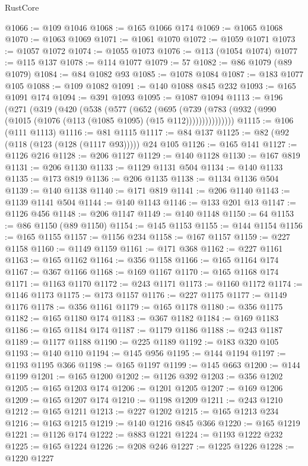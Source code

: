 \begin{lexlean}{RustCore}
\begin{coremodule}
@1066 := @109 @1046
@1068 := @165 @1066 @174
@1069 := @1065 @1068
@1070 := @1063 @1069
@1071 := @1061 @1070
@1072 := @1059 @1071
@1073 := @1057 @1072
@1074 := @1055 @1073
@1076 := @113 (@1054 @1074)
@1077 := @115 @137
@1078 := @114 @1077
@1079 := 57
@1082 := @86 @1079 (@89 @1079)
@1084 := @84 @1082 @93
@1085 := @1078 @1084
@1087 := @183 @1077 @105
@1088 := @109 @1082
@1091 := @140 @1088 @845 @232
@1093 := @165 @1091 @174
@1094 := @391 @1093
@1095 := @1087 @1094
@1113 := @196
    (@271
      (@319
        (@420
          (@538
            (@577
              (@652
                (@695
                  (@739 (@783 (@932 (@990 (@1015 (@1076 (@113 (@1085 @1095) (@15 @112)))))))))))))))
@1115 := @106 (@111 @1113)
@1116 := @81 @1115
@1117 := @84 @137
@1125 := @82 (@92 (@118 (@123 (@128 (@1117 @93))))) @24 @105
@1126 := @165 @141
@1127 := @1126 @216
@1128 := @206 @1127
@1129 := @140 @1128
@1130 := @167 @819
@1131 := @206 @1130
@1133 := @1129 @1131 @504
@1134 := @140 @1133
@1135 := @173 @819
@1136 := @206 @1135
@1138 := @1134 @1136 @504
@1139 := @140 @1138
@1140 := @171 @819
@1141 := @206 @1140
@1143 := @1139 @1141 @504
@1144 := @140 @1143
@1146 := @133 @201 @13
@1147 := @1126 @456
@1148 := @206 @1147
@1149 := @140 @1148
@1150 := 64
@1153 := @86 @1150 (@89 @1150)
@1154 := @145 @1153
@1155 := @144 @1154
@1156 := @165 @1155
@1157 := @1156 @234
@1158 := @167 @1157
@1159 := @227 @1158
@1160 := @1149 @1159
@1161 := @171 @368
@1162 := @227 @1161
@1163 := @165 @1162
@1164 := @356 @1158
@1166 := @165 @1164 @174
@1167 := @367 @1166
@1168 := @169 @1167
@1170 := @165 @1168 @174
@1171 := @1163 @1170
@1172 := @243 @1171
@1173 := @1160 @1172
@1174 := @1146 @1173
@1175 := @173 @1157
@1176 := @227 @1175
@1177 := @1149 @1176
@1178 := @356 @1161
@1179 := @165 @1178
@1180 := @356 @1175
@1182 := @165 @1180 @174
@1183 := @367 @1182
@1184 := @169 @1183
@1186 := @165 @1184 @174
@1187 := @1179 @1186
@1188 := @243 @1187
@1189 := @1177 @1188
@1190 := @225 @1189
@1192 := @183 @320 @105
@1193 := @140 @110
@1194 := @145 @956
@1195 := @144 @1194
@1197 := @1193 @1195 @366
@1198 := @165 @1197
@1199 := @145 @663
@1200 := @144 @1199
@1201 := @165 @1200
@1202 := @1126 @392
@1203 := @356 @1202
@1205 := @165 @1203 @174
@1206 := @1201 @1205
@1207 := @169 @1206
@1209 := @165 @1207 @174
@1210 := @1198 @1209
@1211 := @243 @1210
@1212 := @165 @1211
@1213 := @227 @1202
@1215 := @165 @1213 @234
@1216 := @163 @1215
@1219 := @140 @1216 @845 @366
@1220 := @165 @1219
@1221 := @1126 @174
@1222 := @883 @1221
@1224 := @1193 @1222 @232
@1225 := @165 @1224
@1226 := @208 @246
@1227 := @1225 @1226
@1228 := @1220 @1227

\end{coremodule}
\end{lexlean}
